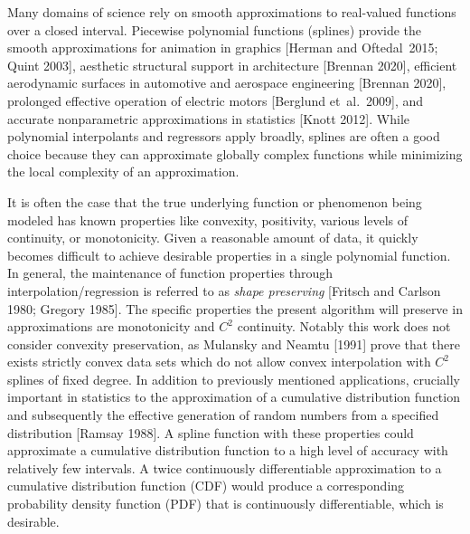 
Many domains of science rely on smooth approximations to real-valued
functions over a closed interval. Piecewise polynomial functions
(splines) provide the smooth approximations for animation in graphics
[Herman and Oftedal\ 2015; Quint 2003], aesthetic structural support in
architecture [Brennan 2020], efficient aerodynamic surfaces in
automotive and aerospace engineering [Brennan 2020], prolonged
effective operation of electric motors [Berglund et\ al.\ 2009], and
accurate nonparametric approximations in statistics [Knott
2012]. While polynomial interpolants and regressors apply broadly,
splines are often a good choice because they can approximate globally
complex functions while minimizing the local complexity of an
approximation.

It is often the case that the true underlying function or phenomenon
being modeled has known properties like convexity, positivity,
various levels of continuity, or monotonicity. Given a reasonable
amount of data, it quickly becomes difficult to achieve desirable
properties in a single polynomial function. In general, the
maintenance of function properties through interpolation/regression is
referred to as {\it shape preserving} [Fritsch and Carlson 1980;
Gregory 1985]. The specific properties the present algorithm will
preserve in approximations are monotonicity and $C^2$ continuity. 
\beginred
Notably this work does not consider convexity preservation, as Mulansky
and Neamtu [1991] prove that there exists strictly convex data sets which
do not allow convex interpolation with $C^2$ splines of fixed degree.
\endred
In addition to previously mentioned applications, 
crucially important in statistics to the approximation of a cumulative
distribution function and subsequently the effective generation of
random numbers from a specified distribution [Ramsay 1988].  A spline
function with these properties could approximate a cumulative
distribution function to a high level of accuracy with relatively few
intervals. A twice continuously differentiable approximation to a
cumulative distribution function (CDF) would produce a corresponding
probability density function (PDF) that is continuously
differentiable, which is desirable.

\beginred

